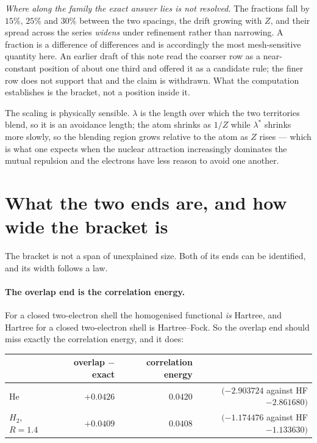 \documentclass[11pt]{article}
\begin{document}
\emph{Where along the family the exact answer lies is not resolved.} The fractions fall by
$15\%$, $25\%$ and $30\%$ between the two spacings, the drift growing with $Z$, and their spread
across the series \emph{widens} under refinement rather than narrowing. A fraction is a difference of
differences and is accordingly the most mesh-sensitive quantity here. An earlier draft of this note
read the coarser row as a near-constant position of about one third and offered it as a candidate
rule; the finer row does not support that and the claim is withdrawn. What the computation
establishes is the bracket, not a position inside it.

The scaling is physically sensible. $\lambda$ is the length over which the two territories blend, so
it is an avoidance length; the atom shrinks as $1/Z$ while $\lambda^\ast$ shrinks more slowly, so the
blending region grows relative to the atom as $Z$ rises --- which is what one expects when the
nuclear attraction increasingly dominates the mutual repulsion and the electrons have less reason to
avoid one another.

\section{What the two ends are, and how wide the bracket is}\label{sec:width}

The bracket is not a span of unexplained size. Both of its ends can be identified, and its width
follows a law.

\paragraph{The overlap end is the correlation energy.} For a closed two-electron shell the
homogenised functional \emph{is} Hartree, and Hartree for a closed two-electron shell is
Hartree--Fock. So the overlap end should miss exactly the correlation energy, and it does:

\begin{center}\small
\begin{tabular}{lrrr}
\toprule
 & overlap $-$ exact & correlation energy & \\
\midrule
He          & $+0.0426$ & $0.0420$ & $(-2.903724$ against HF $-2.861680)$ \\
$H_2$, $R=1.4$ & $+0.0409$ & $0.0408$ & $(-1.174476$ against HF $-1.133630)$ \\
\bottomrule
\end{tabular}
\end{center}
\end{document}
